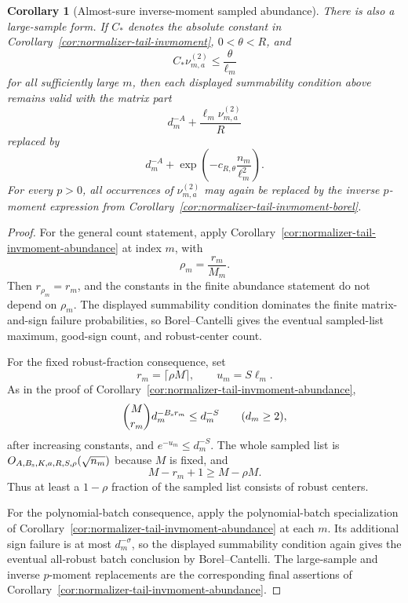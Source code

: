 \documentclass[11pt]{amsart}
\numberwithin{equation}{section}
\newtheorem{corollary}[theorem]{Corollary}
\theoremstyle{definition}
\theoremstyle{remark}
\begin{document}
\begin{corollary}[Almost-sure inverse-moment sampled abundance]
There is also a large-sample form.  If \(C_*\) denotes the absolute constant in
Corollary~\ref{cor:normalizer-tail-invmoment}, \(0<\theta<R\), and
\[
  C_*\nu_{m,a}^{(2)}\le \frac{\theta}{\ell_m}
\]
for all sufficiently large \(m\), then each displayed summability condition
above remains valid with the matrix part
\[
  d_m^{-A}+\frac{\ell_m\nu_{m,a}^{(2)}}{R}
\]
replaced by
\[
  d_m^{-A}+\exp\left(-c_{R,\theta}\frac{n_m}{\ell_m^2}\right).
\]
For every \(p>0\), all occurrences of \(\nu_{m,a}^{(2)}\) may again be replaced
by the inverse \(p\)-moment expression from
Corollary~\ref{cor:normalizer-tail-invmoment-borel}.
\end{corollary}

\begin{proof}
For the general count statement, apply
Corollary~\ref{cor:normalizer-tail-invmoment-abundance} at index \(m\), with
\[
  \rho_m=\frac{r_m}{M_m}.
\]
Then \(r_{\rho_m}=r_m\), and the constants in the finite abundance statement do
not depend on \(\rho_m\).  The displayed summability condition dominates the
finite matrix-and-sign failure probabilities, so Borel--Cantelli gives the
eventual sampled-list maximum, good-sign count, and robust-center count.

For the fixed robust-fraction consequence, set
\[
  r_m=\lceil\rho M\rceil,\qquad u_m=S\ell_m .
\]
As in the proof of
Corollary~\ref{cor:normalizer-tail-invmoment-abundance},
\[
  \binom{M}{r_m}d_m^{-B_{\rm s}r_m}\le d_m^{-S}
  \qquad(d_m\ge2),
\]
after increasing constants, and \(e^{-u_m}\le d_m^{-S}\).  The whole sampled
list is \(O_{A,B_{\rm s},K,a,R,S,\rho}(\sqrt{n_m})\) because \(M\) is fixed, and
\[
  M-r_m+1\ge M-\rho M .
\]
Thus at least a \(1-\rho\) fraction of the sampled list consists of robust
centers.

For the polynomial-batch consequence, apply the polynomial-batch specialization
of Corollary~\ref{cor:normalizer-tail-invmoment-abundance} at each \(m\).  Its
additional sign failure is at most \(d_m^{-\sigma}\), so the displayed
summability condition again gives the eventual all-robust batch conclusion by
Borel--Cantelli.  The large-sample and inverse \(p\)-moment replacements are the
corresponding final assertions of
Corollary~\ref{cor:normalizer-tail-invmoment-abundance}.
\end{proof}
\end{document}
